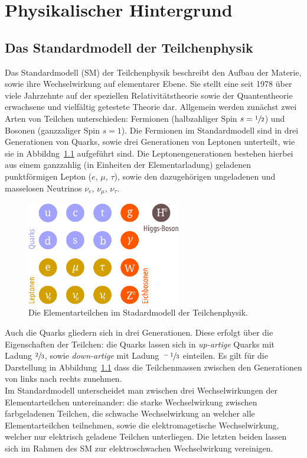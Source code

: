 \chapter{Physikalischer Hintergrund}
\label{chap:2}
%
\section{Das Standardmodell der Teilchenphysik}
%
Das Standardmodell (SM) der Teilchenphysik beschreibt den Aufbau der Materie, sowie ihre Wechselwirkung auf elementarer Ebene. Sie stellt eine seit 1978 über viele Jahrzehnte auf der speziellen Relativitätstheorie sowie der Quantentheorie erwachsene und vielfältig getestete Theorie dar. Allgemein werden zunächst zwei Arten von Teilchen unterschieden: Fermionen (halbzahliger Spin $s=\sfrac{1}{2}$) und Bosonen (ganzzaliger Spin $s=1$). Die Fermionen im Standardmodell sind in drei Generationen von Quarks, sowie drei Generationen von Leptonen unterteilt, wie sie in Abbildng~\ref{fig:particles} aufgeführt sind. Die Leptonengenerationen bestehen hierbei aus einem ganzzahlig (in Einheiten der Elementarladung) geladenen punktförmigen Lepton ($e$, $\mu$, $\tau$), sowie den dazugehörigen ungeladenen und masselosen Neutrinos $\nu_e$, $\nu_\mu$, $\nu_\tau$.
%
\begin{figure}
  \centering
      \includegraphics[width=0.6\textwidth]{Plots/SM.pdf}
  \caption{Die Elementarteilchen im Stadardmodell der Teilchenphysik.}
  \label{fig:particles}
\end{figure}
%
Auch die Quarks gliedern sich in drei Generationen. Diese erfolgt über die Eigenschaften der Teilchen: die Quarks lassen sich in \textit{up-artige} Quarks mit Ladung $\sfrac{2}{3}$, sowie \textit{down-artige} mit Ladung $\sfrac{-1}{3}$ einteilen. Es gilt für die Darstellung in Abbildung~\ref{fig:particles} dass die Teilchenmassen zwischen den Generationen von links nach rechts zunehmen.\\
Im Standardmodell unterscheidet man zwischen drei Wechselwirkungen der Elementarteilchen untereinander: die starke Wechselwirkung zwischen farbgeladenen Teilchen, die schwache Wechselwirkung an welcher alle Elementarteilchen teilnehmen, sowie die elektromagetische Wechselwirkung, welcher nur elektrisch geladene Teilchen unterliegen. Die letzten beiden lassen sich im Rahmen des SM zur elektroschwachen Wechselwirkung vereinigen.
